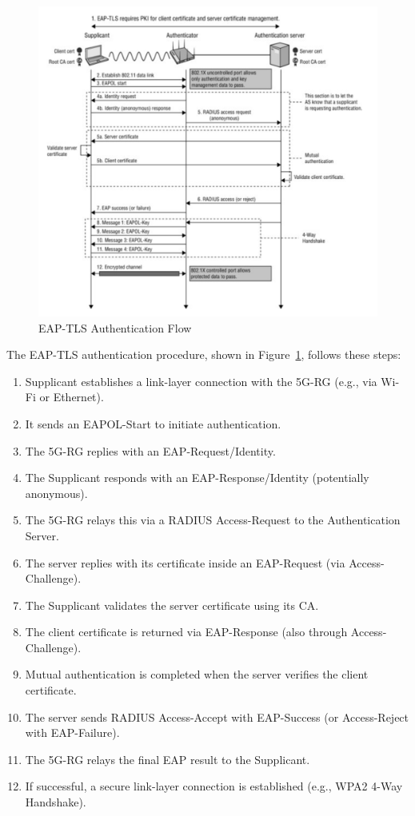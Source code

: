 \begin{figure}
    \centering
    \includegraphics[width=0.75\linewidth]{figs/eap-tls-auth-flow.png}
    \caption{\ac{EAP-TLS} Authentication Flow}
    \label{fig:eap-tls-auth-flow}
\end{figure}

The \ac{EAP-TLS} authentication procedure, shown in Figure~\ref{fig:eap-tls-auth-flow}, follows these steps:

\begin{enumerate}
    \item Supplicant establishes a link-layer connection with the \ac{5G-RG} (e.g., via Wi-Fi or Ethernet).
    \item It sends an \ac{EAPOL}-Start to initiate authentication.
    \item The 5G-RG replies with an \ac{EAP}-Request/Identity.
    \item The Supplicant responds with an \ac{EAP}-Response/Identity (potentially anonymous).
    \item The 5G-RG relays this via a \ac{RADIUS} Access-Request to the Authentication Server.
    \item The server replies with its certificate inside an \ac{EAP}-Request (via Access-Challenge).
    \item The Supplicant validates the server certificate using its \ac{CA}.
    \item The client certificate is returned via \ac{EAP}-Response (also through Access-Challenge).
    \item Mutual authentication is completed when the server verifies the client certificate.
    \item The server sends \ac{RADIUS} Access-Accept with \ac{EAP}-Success (or Access-Reject with \ac{EAP}-Failure).
    \item The 5G-RG relays the final \ac{EAP} result to the Supplicant.
    \item If successful, a secure link-layer connection is established (e.g., WPA2 4-Way Handshake).
\end{enumerate}

